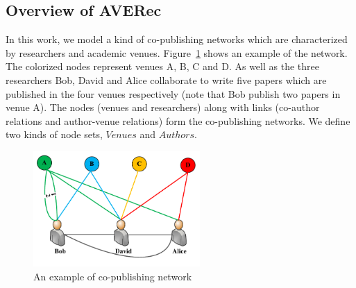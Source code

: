 \documentclass[9pt]{acm_proc_article-sp}
\begin{document}
\subsection{Overview of AVERec}
In this work, we model a kind of co-publishing networks which are characterized by researchers and academic venues. Figure~\ref{Fig2} shows an example of the network. The colorized nodes represent venues A, B, C and D. As well as the three researchers Bob, David and Alice collaborate to write five papers which are published in the four venues respectively (note that Bob publish two papers in venue A). The nodes (venues and researchers) along with links (co-author relations and author-venue relations) form the co-publishing networks. We define two kinds of node sets, $Venues$ and $Authors$.
\begin{figure}[t]
\centering
\includegraphics [width=2.5in]{Fig2.pdf}
\caption{An example of co-publishing network}
\label{Fig2}
\end{figure}
\end{document}
